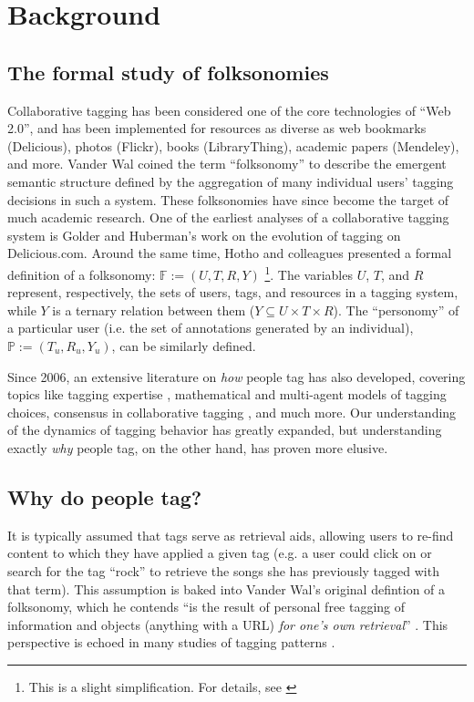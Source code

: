 \section{Background}
\label{sec_related}

\subsection{The formal study of folksonomies}
Collaborative tagging has been considered one of the core technologies of ``Web 2.0'', and has been implemented for resources as diverse as web bookmarks (Delicious), photos (Flickr), books (LibraryThing), academic papers (Mendeley), and more. Vander Wal \cite{VanderWal2007} coined the term ``folksonomy'' to describe the emergent semantic structure defined by the aggregation of many individual users' tagging decisions in such a system. These folksonomies have since become the target of much academic research. One of the earliest analyses of a collaborative tagging system is Golder and Huberman's \cite{Golder2006} work on the evolution of tagging on Delicious.com.  Around the same time, Hotho and colleagues \cite{Hotho2006a} presented a formal definition of a folksonomy: $\mathbb{F} := (U,T,R,Y)$ \footnote{This is a slight simplification. For details, see \cite{Hotho2006a}}. The variables $U$, $T$, and $R$ represent, respectively, the sets of users, tags, and resources in a tagging system, while $Y$ is a ternary relation between them ($Y \subseteq U \times T \times R$). The ``personomy'' of a particular user (i.e. the set of annotations generated by an individual),  $\mathbb{P} := (T_{u},R_{u},Y_{u})$, can be similarly defined.

Since 2006, an extensive literature on \emph{how} people tag has also developed, covering topics like tagging expertise \cite{Yeung2011},	mathematical \cite{Cattuto2007a} and multi-agent \cite{Lorince2013} models of tagging choices, consensus in collaborative tagging \cite{Halpin2007,Robu2009}, and much more. Our understanding of the dynamics of tagging behavior has greatly expanded, but understanding exactly \emph{why} people tag, on the other hand, has proven more elusive.

\subsection{Why do people tag?}
It is typically assumed that tags serve as retrieval aids, allowing users to re-find content to which they have applied a given tag (e.g. a user could click on or search for the tag ``rock'' to retrieve the songs she has previously tagged with that term). This assumption is baked into Vander Wal's original defintion of a folksonomy, which he contends ``is the result of personal free tagging of information and objects (anything with a URL) \emph{for one's own retrieval}'' \cite[emphasis added]{VanderWal2007}. This perspective is echoed in many studies of tagging patterns \cite{Glushko2008,Halpin2007,Golder2006}.

